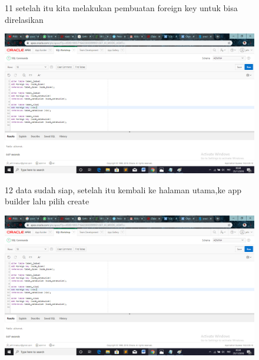 \begin{enumerate}
\begin{figure}
\item[11]setelah itu kita melakukan pembuatan foreign key untuk bisa direlasikan
    \begin{center}
\includegraphics[scale=0.4]{apex/ss17.png}
    \caption{\textit{}}
        \end{center}
\label{gambar}
\end{figure}


\begin{figure}
\item[12]data sudah siap, setelah itu kembali ke halaman utama,ke app builder lalu pilih create
 \begin{center}
\includegraphics[scale=0.4]{apex/ss17.png}
    \caption{\textit{}}
        \end{center}
\label{gambar}
\end{figure}


\end{enumerate}
